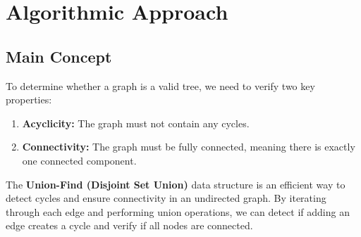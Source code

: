 
\section*{Algorithmic Approach}

\subsection*{Main Concept}
To determine whether a graph is a valid tree, we need to verify two key properties:

\begin{enumerate}
    \item \textbf{Acyclicity:} The graph must not contain any cycles.
    \item \textbf{Connectivity:} The graph must be fully connected, meaning there is exactly one connected component.
\end{enumerate}

The \textbf{Union-Find (Disjoint Set Union)} data structure is an efficient way to detect cycles and ensure connectivity in an undirected graph. By iterating through each edge and performing union operations, we can detect if adding an edge creates a cycle and verify if all nodes are connected.


